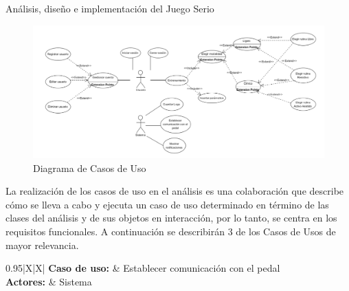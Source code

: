 \begin{thesischapter}{2} {Análisis, diseño e implementación del Juego Serio}
    \begin{figure}[ht]
        \centering
        \includegraphics[scale=0.4]{images/casosdeuso.png}
        \caption{Diagrama de Casos de Uso}
        \label{fig: use-cases}
    \end{figure}

    La realización de los casos de uso en el análisis es una colaboración que describe cómo se lleva a cabo y ejecuta un caso de uso determinado en término de las clases del análisis y de sus objetos en interacción, por lo tanto, se centra en los requisitos funcionales. A 
    continuación se describirán 3 de los Casos de Usos de mayor relevancia.
    
    
    \begin{center}
        \begin{table}
            \begin{tabularx}{0.95\textwidth}{|X|X|}
                \hline
                \textbf{Caso de uso:} & Establecer comunicación con el pedal \\\hline
                \textbf{Actores:} &  Sistema \\\hline
                 \\\hline
                

\end{tabularx}
\end{table}
\end{center}
\end{thesischapter}
